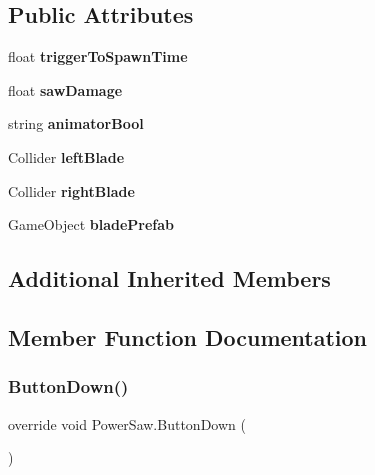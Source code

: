 \subsection*{Public Attributes}
\begin{DoxyCompactItemize}
\item 
\hypertarget{class_power_saw_ad2f629e635babbc6bbebfbf52cf06b1b}{}\label{class_power_saw_ad2f629e635babbc6bbebfbf52cf06b1b} 
float {\bfseries trigger\+To\+Spawn\+Time}
\item 
\hypertarget{class_power_saw_acdaae6aa2a2b32d4aeba26a67ef7f993}{}\label{class_power_saw_acdaae6aa2a2b32d4aeba26a67ef7f993} 
float {\bfseries saw\+Damage}
\item 
\hypertarget{class_power_saw_acf603f3ab5e3226cbd2fe8ce6fa034ca}{}\label{class_power_saw_acf603f3ab5e3226cbd2fe8ce6fa034ca} 
string {\bfseries animator\+Bool}
\item 
\hypertarget{class_power_saw_acfef49bdac2cd6562302c1548052cf75}{}\label{class_power_saw_acfef49bdac2cd6562302c1548052cf75} 
Collider {\bfseries left\+Blade}
\item 
\hypertarget{class_power_saw_a4417aae741d4e2de1ad085d4c74cb52c}{}\label{class_power_saw_a4417aae741d4e2de1ad085d4c74cb52c} 
Collider {\bfseries right\+Blade}
\item 
\hypertarget{class_power_saw_aded3502a1bcb4c98a9bdc3d4a28e85d0}{}\label{class_power_saw_aded3502a1bcb4c98a9bdc3d4a28e85d0} 
Game\+Object {\bfseries blade\+Prefab}
\end{DoxyCompactItemize}
\subsection*{Additional Inherited Members}


\subsection{Member Function Documentation}
\hypertarget{class_power_saw_a7709f4f49760b8052c45648a1a13ee83}{}\label{class_power_saw_a7709f4f49760b8052c45648a1a13ee83} 
\subsubsection{\texorpdfstring{Button\+Down()}{ButtonDown()}}
{\footnotesize\ttfamily override void Power\+Saw.\+Button\+Down (\begin{DoxyParamCaption}{ }\end{DoxyParamCaption})\hspace{0.3cm}{\ttfamily [virtual]}}



